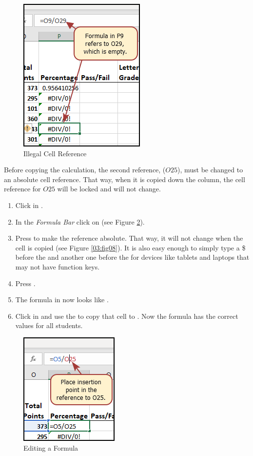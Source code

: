 \begin{figure}[H]
	\centering
	\includegraphics[width=\maxwidth{.50\linewidth}]{gfx/ch03_fig07a}
	\caption{Illegal Cell Reference}
	\label{03:fig07a}
\end{figure}

Before copying the calculation, the second reference, ($ O25 $), must be changed to an absolute cell reference. That way, when it is copied down the column, the cell reference for $ O25 $ will be locked and will not change.

\begin{enumerate}
	\item Click in . 
	\item In the \textit{Formula Bar} click on  (see Figure \ref{03:fig07}).
	\item Press  to make the  reference absolute. That way, it will not change when the cell is copied (see Figure \ref{03:fig08}). It is also easy enough to simply type a \$ before the  and another one before the  for devices like tablets and laptops that may not have function keys.
	\item Press .
	\item The formula in  now looks like .
	\item Click in  and use the  to copy that cell to . Now the formula has the correct values for all students.
\end{enumerate}

\begin{figure}[H]
	\centering
	\includegraphics[width=\maxwidth{.40\linewidth}]{gfx/ch03_fig07}
	\caption{Editing a Formula}
	\label{03:fig07}
\end{figure}


